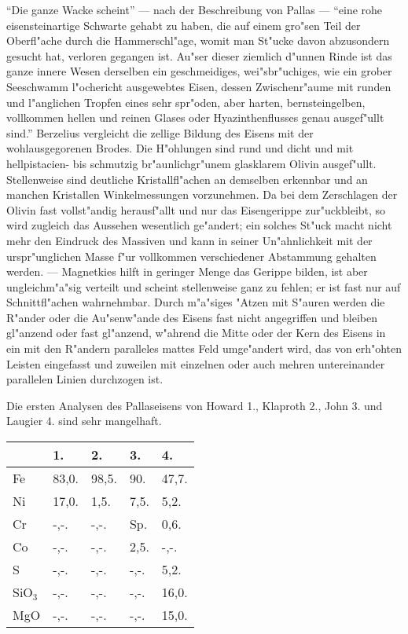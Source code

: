 \documentclass[a4paper, 11pt, oneside]{article}
\begin{document}
"`Die ganze Wacke scheint"' --- nach der Beschreibung von Pallas --- "`eine rohe eisensteinartige Schwarte gehabt zu haben, die auf einem gro"sen Teil der Oberfl"ache durch die Hammerschl"age, womit man St"ucke davon abzusondern gesucht hat, verloren gegangen ist. Au"ser dieser ziemlich d"unnen Rinde ist das ganze innere Wesen derselben ein geschmeidiges, wei"sbr"uchiges, wie ein grober Seeschwamm l"ochericht ausgewebtes Eisen, dessen Zwischenr"aume mit runden und l"anglichen Tropfen eines sehr spr"oden, aber harten, bernsteingelben, vollkommen hellen und reinen Glases oder Hyazinthenflusses genau ausgef"ullt sind."' Berzelius vergleicht die zellige Bildung des Eisens mit der wohlausgegorenen Brodes. Die H"ohlungen sind rund und dicht und mit hellpistacien- bis schmutzig br"aunlichgr"unem glasklarem Olivin ausgef"ullt. Stellenweise sind deutliche Kristallfl"achen an demselben erkennbar und an manchen Kristallen Winkelmessungen vorzunehmen. Da bei dem Zerschlagen der Olivin fast vollst"andig herausf"allt und nur das Eisengerippe zur"uckbleibt, so wird zugleich das Aussehen wesentlich ge"andert; ein solches St"uck macht nicht mehr den Eindruck des Massiven und kann in seiner Un"ahnlichkeit mit der urspr"unglichen Masse f"ur vollkommen verschiedener Abstammung gehalten werden. --- Magnetkies hilft in geringer Menge das Gerippe bilden, ist aber ungleichm"a"sig verteilt und scheint stellenweise ganz zu fehlen; er ist fast nur auf Schnittfl"achen wahrnehmbar. Durch m"a"siges "Atzen mit S"auren werden die R"ander oder die Au"senw"ande des Eisens fast nicht angegriffen und bleiben gl"anzend oder fast gl"anzend, w"ahrend die Mitte oder der Kern des Eisens in ein mit den R"andern paralleles mattes Feld umge"andert wird, das von erh"ohten Leisten eingefasst und zuweilen mit einzelnen oder auch mehren untereinander parallelen Linien durchzogen ist.

Die ersten Analysen des Pallaseisens von Howard 1., Klaproth 2., John 3. und Laugier 4. sind sehr mangelhaft.
\begin{table}[H]
    \centering\swabfamily\Large
    \begin{tabular}{l l l l l}
         & 1. & 2. & 3. & 4. \\ \hline
        Fe & 83,0. & 98,5. & 90. & 47,7. \\
        Ni & 17,0. & 1,5. & 7,5. & 5,2. \\
        Cr & -,-. & -,-. & Sp. & 0,6. \\
        Co & -,-. & -,-. & 2,5. & -,-. \\
        S & -,-. & -,-. & -,-. & 5,2. \\
        SiO$_{3}$ & -,-. & -,-. & -,-. & 16,0. \\
        MgO & -,-. & -,-. & -,-. & 15,0. \\
    \end{tabular}
\end{table}
\end{document}
